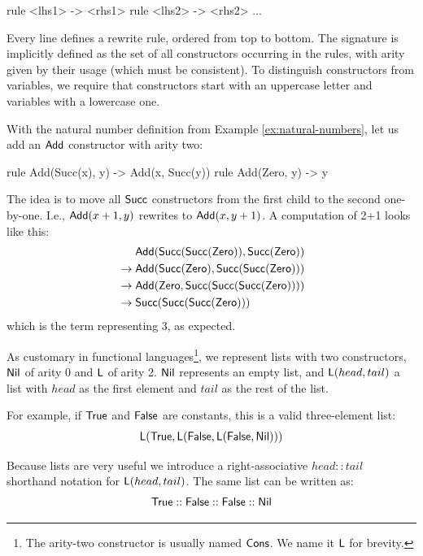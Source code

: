 \documentclass[11pt]{article}
\begin{document}
\begin{rrscode}
rule <lhs1> -> <rhs1>
rule <lhs2> -> <rhs2>
...
\end{rrscode}

Every line defines a rewrite rule, ordered from top to bottom. The signature is implicitly
defined as the set of all constructors occurring in the rules, with arity given by their
usage (which must be consistent). To distinguish constructors from variables, we require that
constructors start with an uppercase letter and variables with a lowercase one.

\begin{example}
With the natural number definition from Example \ref{ex:natural-numbers}, let us add an
$\mathsf{Add}$ constructor with arity two:

\begin{rrscode}
rule Add(Succ(x), y) -> Add(x, Succ(y))
rule Add(Zero, y) -> y
\end{rrscode}

The idea is to move all $\mathsf{Succ}$ constructors from the first child to the second
one-by-one. I.e., $\mathsf{Add}(x+1, y)$ rewrites to $\mathsf{Add}(x, y+1)$. A computation
of 2+1 looks like this:
\begin{align*}
  &\mathsf{Add}(\mathsf{Succ}(\mathsf{Succ}(\mathsf{Zero})), \mathsf{Succ}(\mathsf{Zero})) \\
  {}\to{} &\mathsf{Add}(\mathsf{Succ}(\mathsf{Zero}), \mathsf{Succ}(\mathsf{Succ}(\mathsf{Zero}))) \\
  {}\to{} &\mathsf{Add}(\mathsf{Zero}, \mathsf{Succ}(\mathsf{Succ}(\mathsf{Succ}(\mathsf{Zero})))) \\
  {}\to{} &\mathsf{Succ}(\mathsf{Succ}(\mathsf{Succ}(\mathsf{Zero})))
\end{align*}
which is the term representing 3, as expected.

\end{example}

\begin{example}[Lists]
As customary in functional languages\footnote{The arity-two constructor is usually named
$\mathsf{Cons}$. We name it $\mathsf{L}$ for brevity.}, we represent lists with two constructors,
$\mathsf{Nil}$ of arity 0 and $\mathsf{L}$ of arity 2. $\mathsf{Nil}$ represents an empty list,
and $\mathsf{L}(head, tail)$ a list with $head$ as the first element and $tail$ as the rest
of the list.

For example, if $\mathsf{True}$ and $\mathsf{False}$ are constants, this is a valid three-element
list:
\begin{align*}
\mathsf{L}(\mathsf{True}, \mathsf{L}(\mathsf{False}, \mathsf{L}(\mathsf{False}, \mathsf{Nil})))
\end{align*}

Because lists are very useful we introduce a right-associative $head :: tail$
shorthand notation for $\mathsf{L}(head, tail)$. The same list can be written as:
\begin{align*}
\mathsf{True} :: \mathsf{False} :: \mathsf{False} :: \mathsf{Nil}
\end{align*}
\end{example}
\end{document}
